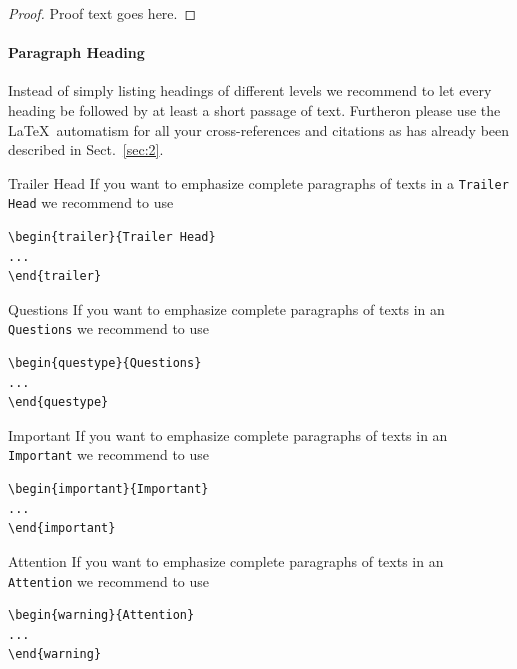 \begin{proof}
    Proof text goes here.
\end{proof}

\paragraph{Paragraph Heading} %
Instead of simply listing headings of different levels we recommend to let every heading be followed by at least a short passage of text. Furtheron please use the \LaTeX\ automatism for all your cross-references and citations as has already been described in Sect.~\ref{sec:2}.

\begin{trailer}{Trailer Head}
    If you want to emphasize complete paragraphs of texts in a \verb|Trailer Head| we recommend to
    use  \begin{verbatim}\begin{trailer}{Trailer Head}
...
\end{trailer}\end{verbatim}
\end{trailer}
%
\begin{questype}{Questions}
    If you want to emphasize complete paragraphs of texts in an \verb|Questions| we recommend to
    use  \begin{verbatim}\begin{questype}{Questions}
...
\end{questype}\end{verbatim}
\end{questype}
%
%
\begin{important}{Important}
    If you want to emphasize complete paragraphs of texts in an \verb|Important| we recommend to
    use  \begin{verbatim}\begin{important}{Important}
...
\end{important}\end{verbatim}
\end{important}
%
\clearpage
\begin{warning}{Attention}
    If you want to emphasize complete paragraphs of texts in an \verb|Attention| we recommend to
    use  \begin{verbatim}\begin{warning}{Attention}
...
\end{warning}\end{verbatim}
\end{warning}


